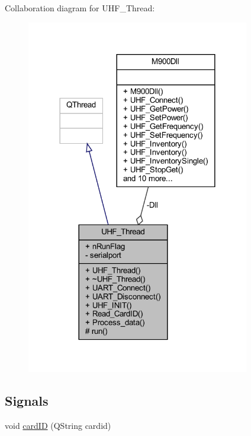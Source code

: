 Collaboration diagram for U\+H\+F\+\_\+\+Thread\+:
\nopagebreak
\begin{figure}[H]
\begin{center}
\leavevmode
\includegraphics[width=276pt]{class_u_h_f___thread__coll__graph}
\end{center}
\end{figure}
\subsection*{Signals}
\begin{DoxyCompactItemize}
\item 
void \mbox{\hyperlink{class_u_h_f___thread_a4382c7acd8bb18adbaa580d3fb76ae17}{card\+ID}} (Q\+String cardid)
\end{DoxyCompactItemize}
